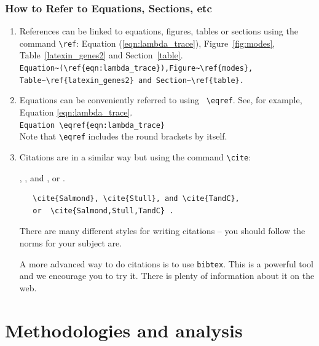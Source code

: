 \documentclass[11pt]{book}
\begin{document}
\subsection{How to Refer to Equations, Sections, etc}%
 \begin{enumerate}
 \item References can be linked to equations, figures, tables or sections using the command 
 \verb+\ref+:
 Equation (\ref{eqn:lambda_trace}),  Figure~\ref{fig:modes},  Table~\ref{latexin_genes2} and Section~\ref{table}.\\
\verb+Equation~(\ref{eqn:lambda_trace}),Figure~\ref{modes},+\\
\verb+Table~\ref{latexin_genes2} and Section~\ref{table}.+


\item 
Equations can be conveniently  referred to using \verb+ \eqref+. See, for example,  Equation \eqref{eqn:lambda_trace}. \\
\verb+Equation \eqref{eqn:lambda_trace}+\\
Note that \verb+\eqref+ includes the round brackets by itself. 

\item  Citations are in a similar way but using the command \verb+\cite+:

  \cite{Salmond}, \cite{Stull}, and \cite{TandC}, 
   or  \cite{Salmond,Stull,TandC} .
   
  \begin{verbatim}   
   \cite{Salmond}, \cite{Stull}, and \cite{TandC}, 
   or  \cite{Salmond,Stull,TandC} .
 \end{verbatim} 

There are many different styles for writing citations -- you should follow the norms for your subject are.

A more advanced way to do citations is to use \verb+bibtex+.  This is a powerful tool and we encourage you to try it.  There is plenty of information about it on the web.

 
 \end{enumerate}
 
 
 
\chapter{Methodologies and analysis}
\end{document}
